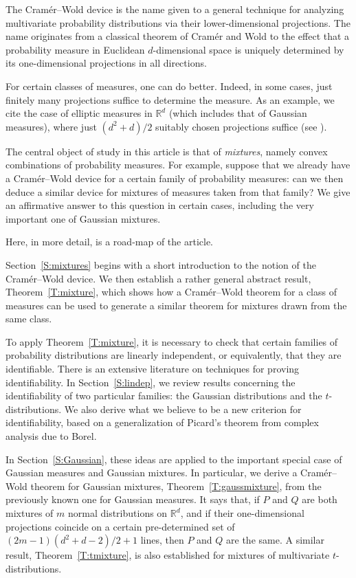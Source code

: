 \documentclass[11pt]{amsart}
\theoremstyle{plain}
\theoremstyle{remark}
\newcommand{\RR}{\mathbb{R}}
\begin{document}
The Cram\'er--Wold device is the name given to a general
technique for analyzing multivariate probability distributions 
via their lower-dimensional projections. The name originates
from a classical theorem of Cram\'er and Wold \cite{CW36} to the effect that
a probability measure in Euclidean $d$-dimensional space is 
uniquely determined by its one-dimensional projections in all directions.
	
For certain classes of measures, one can do better.
Indeed, in some cases,  just finitely many projections suffice to determine the measure. 
As an example, we cite the
case of elliptic measures in $\RR^d$
(which includes that of Gaussian measures), 
where just $(d^2+d)/2$ suitably chosen  projections suffice (see \cite{FMR23a}).
	
The central object of study in this article is that of \emph{mixtures}, 
namely convex combinations of probability measures. 
For example, suppose that we already have a Cram\'er--Wold device 
for a certain  family of probability measures: 
can we then deduce a similar device for mixtures of measures taken from that family? 
We give an affirmative answer to this question in certain cases, 
including the very important one of Gaussian mixtures. 
	
Here, in more detail, is a road-map of the article.	
	
Section~\ref{S:mixtures} begins with a short introduction to the notion of the Cram\'er--Wold device.
We then establish a rather general abstract result, Theorem~\ref{T:mixture},
which shows how a Cram\'er--Wold theorem 
for a class of measures can be used to generate a similar theorem for mixtures drawn from the same class.
	
To apply Theorem~\ref{T:mixture},
it is necessary to check that certain families of
probability distributions are linearly independent, or equivalently,
that they are identifiable. There is an extensive literature
on techniques for proving identifiability.
In Section~\ref{S:lindep}, we review results concerning the identifiability of 
two particular families: the Gaussian distributions and the $t$-distributions.
We also derive what we believe to be a new  criterion for identifiability,
based on a generalization of Picard's theorem from complex analysis due to Borel.
	
In Section~\ref{S:Gaussian},
these ideas are  applied to the  important
special case of Gaussian measures and Gaussian mixtures. 
In particular, we derive
a Cra\-m\'er--Wold theorem for Gaussian mixtures,
Theorem~\ref{T:gaussmixture}, from the previously known one for Gaussian measures.
It says that, if $P$ and $Q$ are both mixtures of $m$
normal distributions on $\RR^d$,
and if their
one-dimensional projections  coincide 
on a certain pre-determined set of $(2m-1)(d^2+d-2)/2+1$ lines, 
then $P$ and $Q$ are the same. 
A similar result, Theorem~\ref{T:tmixture}, is also established for mixtures of multivariate
$t$-distributions.
	
\end{document}
